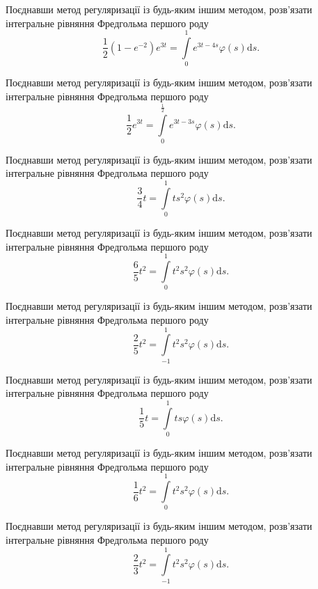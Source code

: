 \documentclass[12pt]{extarticle}
\begin{document}
\begin{Exercise}
Поєднавши метод регуляризації із будь-яким іншим методом, розв’язати інтегральне рівняння Фредгольма першого роду \[\dfrac{1}{2}\left(1 - e^{-2}\right)e^{3t} = \int\limits_{0}^{1} e^{3t-4s} \varphi(s) \mathrm{d}s.\]
\end{Exercise}

\begin{Exercise}
Поєднавши метод регуляризації із будь-яким іншим методом, розв’язати інтегральне рівняння Фредгольма першого роду \[\dfrac{1}{2}e^{3t} = \int\limits_{0}^{\frac{1}{2}} e^{3t-3s} \varphi(s) \mathrm{d}s.\]
\end{Exercise}

\begin{Exercise}
Поєднавши метод регуляризації із будь-яким іншим методом, розв’язати інтегральне рівняння Фредгольма першого роду \[\dfrac{3}{4}t = \int\limits_{0}^{1} ts^2 \varphi(s) \mathrm{d}s.\]
\end{Exercise}

\begin{Exercise}
Поєднавши метод регуляризації із будь-яким іншим методом, розв’язати інтегральне рівняння Фредгольма першого роду \[\dfrac{6}{5}t^2 = \int\limits_{0}^{1} t^2 s^2 \varphi(s) \mathrm{d}s.\]
\end{Exercise}

\begin{Exercise}
Поєднавши метод регуляризації із будь-яким іншим методом, розв’язати інтегральне рівняння Фредгольма першого роду \[\dfrac{2}{5}t^2 = \int\limits_{-1}^{1} t^2 s^2 \varphi(s) \mathrm{d}s.\]
\end{Exercise}

\begin{Exercise}
Поєднавши метод регуляризації із будь-яким іншим методом, розв’язати інтегральне рівняння Фредгольма першого роду \[\dfrac{1}{5}t = \int\limits_{0}^{1} ts \varphi(s) \mathrm{d}s.\]
\end{Exercise}

\begin{Exercise}
Поєднавши метод регуляризації із будь-яким іншим методом, розв’язати інтегральне рівняння Фредгольма першого роду \[\dfrac{1}{6}t^2 = \int\limits_{0}^{1} t^2s^2 \varphi(s) \mathrm{d}s.\]
\end{Exercise}

\begin{Exercise}
Поєднавши метод регуляризації із будь-яким іншим методом, розв’язати інтегральне рівняння Фредгольма першого роду \[\dfrac{2}{3}t^2 = \int\limits_{-1}^{1} t^2s^2 \varphi(s) \mathrm{d}s.\]
\end{Exercise}
\end{document}
